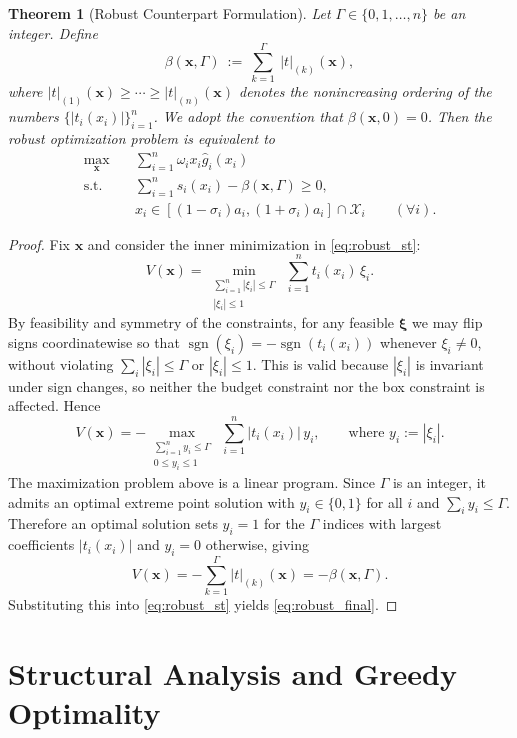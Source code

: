 \documentclass[11pt, a4paper]{article}
\theoremstyle{plain}
\newtheorem{theorem}{Theorem}
\theoremstyle{definition}
\theoremstyle{remark}
\begin{document}
\begin{theorem}[Robust Counterpart Formulation]\label{thm:robust}
Let $\Gamma \in \{0,1,\dots,n\}$ be an integer. Define
\[
\beta(\bm{x},\Gamma)
\ :=\
\sum_{k=1}^{\Gamma} \ |t|_{(k)}(\bm{x}),
\]
where $|t|_{(1)}(\bm{x}) \ge \cdots \ge |t|_{(n)}(\bm{x})$ denotes the nonincreasing ordering of the numbers
$\big\{|t_i(x_i)|\big\}_{i=1}^n$. We adopt the convention that $\beta(\bm{x},0)=0$.
Then the robust optimization problem is equivalent to
\begin{align}
    \max_{\bm{x}} \quad & \sum_{i=1}^n \omega_i x_i \hat{g}_i(x_i) \\
    \text{s.t.} \quad 
    & \sum_{i=1}^n s_i(x_i) - \beta(\bm{x}, \Gamma) \ge 0, \label{eq:robust_final}\\
    & x_i \in [(1-\sigma_i)a_i,(1+\sigma_i)a_i]\cap \mathcal X_i \qquad (\forall i). \nonumber
\end{align}
\end{theorem}

\begin{proof}
Fix $\bm{x}$ and consider the inner minimization in \eqref{eq:robust_st}:
\[
V(\bm{x})
=
\min_{\substack{\sum_{i=1}^n|\xi_i|\le \Gamma\\ |\xi_i|\le 1}}
\ \sum_{i=1}^n t_i(x_i)\,\xi_i .
\]
By feasibility and symmetry of the constraints, for any feasible $\bm{\xi}$ we may flip signs coordinatewise so that
$\operatorname{sgn}(\xi_i)=-\operatorname{sgn}(t_i(x_i))$ whenever $\xi_i\neq 0$, without violating
$\sum_i|\xi_i|\le \Gamma$ or $|\xi_i|\le 1$. This is valid because $|\xi_i|$ is invariant under sign changes, so neither the budget constraint
nor the box constraint is affected. Hence
\[
V(\bm{x})
=
-\max_{\substack{\sum_{i=1}^n y_i \le \Gamma\\ 0\le y_i \le 1}}
\ \sum_{i=1}^n |t_i(x_i)|\,y_i ,
\qquad\text{where } y_i:=|\xi_i|.
\]
The maximization problem above is a linear program. Since $\Gamma$ is an integer, it admits an optimal extreme point solution
with $y_i\in\{0,1\}$ for all $i$ and $\sum_i y_i\le \Gamma$.
Therefore an optimal solution sets $y_i=1$ for the $\Gamma$ indices with largest coefficients $|t_i(x_i)|$ and $y_i=0$ otherwise, giving
\[
V(\bm{x})
=
-\sum_{k=1}^{\Gamma} |t|_{(k)}(\bm{x})
=
-\beta(\bm{x},\Gamma).
\]
Substituting this into \eqref{eq:robust_st} yields \eqref{eq:robust_final}.
\end{proof}

\section{Structural Analysis and Greedy Optimality}\label{sec:structure}
\end{document}
